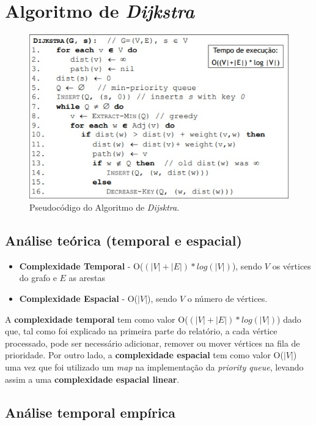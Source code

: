 \documentclass[article, a4paper, 12pt, oneside]{memoir}
\begin{document}
\section{Algoritmo de \textit{Dijkstra}}

\begin{figure}[h!]
  \centerline{\includegraphics[scale=1]{Dijkstra_pseudocode.jpg}}
  \caption{Pseudocódigo do Algoritmo de \textit{Dijsktra}.}
\end{figure}

\subsection{Análise teórica (temporal e espacial)}

\begin{itemize}
	\item \textbf{Complexidade Temporal} -  O($(|V| + |E|)*log(|V|)$), sendo $V$ os vértices do grafo e $E$ as arestas
	\item \textbf{Complexidade Espacial} - O($|V|$), sendo $V$ o número de vértices.
\end{itemize}

A \textbf{complexidade temporal} tem como valor O($(|V| + |E|)*log(|V|)$) dado que, tal como foi explicado na primeira parte do relatório, a cada vértice processado, pode ser necessário adicionar, remover ou mover vértices na fila de prioridade.
Por outro lado, a \textbf{complexidade espacial} tem como valor O($|V|$) uma vez que foi utilizado um \textit{map} na implementação da \textit{priority queue}, levando assim a uma \textbf{complexidade espacial linear}.

\subsection{Análise temporal empírica }
\end{document}
